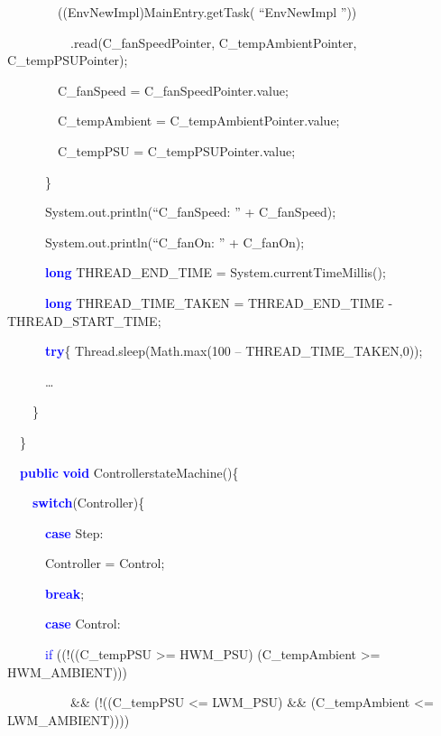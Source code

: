 \documentclass[a4paper]{article}
\begin{document}
{\ttfamily
\ \ \ \ \ \ \ \ ((EnvNewImpl)MainEntry.getTask( ``EnvNewImpl ''))}

{\ttfamily
\ \ \ \ \ \ \ \ \ \ .read(C\_fanSpeedPointer, C\_tempAmbientPointer,
C\_tempPSUPointer);}

{\ttfamily
\ \ \ \ \ \ \ \ C\_fanSpeed = C\_fanSpeedPointer.value;}

{\ttfamily
\ \ \ \ \ \ \ \ C\_tempAmbient = C\_tempAmbientPointer.value;}

{\ttfamily
\ \ \ \ \ \ \ \ C\_tempPSU = C\_tempPSUPointer.value;}

{\ttfamily
\ \ \ \ \ \ \}}

{\ttfamily
\ \ \ \ \ \ System.out.println(``C\_fanSpeed: '' + C\_fanSpeed);}

{\ttfamily
\ \ \ \ \ \ System.out.println(``C\_fanOn: '' + C\_fanOn);}

{\ttfamily
\ \ \ \ \ \ \textbf{\textcolor{blue}{long}} THREAD\_END\_TIME =
System.currentTimeMillis();}

{\ttfamily
\ \ \ \ \ \ \textbf{\textcolor{blue}{long}} THREAD\_TIME\_TAKEN =
THREAD\_END\_TIME - THREAD\_START\_TIME;}

{\ttfamily
\ \ \ \ \ \ \textbf{\textcolor{blue}{try}}\{ Thread.sleep(Math.max(100 -- THREAD\_TIME\_TAKEN,0));}

{\ttfamily
\ \ \ \ \ \ {\dots} }

{\ttfamily
\ \ \ \ \}}

{\ttfamily
\ \ \}}


\bigskip

{\ttfamily
\ \ \textbf{\textcolor{blue}{public}} \textbf{\textcolor{blue}{void}}
ControllerstateMachine()\{}

{\ttfamily
\ \ \ \ \textbf{\textcolor{blue}{switch}}(Controller)\{}

{\ttfamily
\ \ \ \ \ \ \textbf{\textcolor{blue}{case}} Step:}

{\ttfamily
\ \ \ \ \ \ Controller = Control;}

{\ttfamily
\ \ \ \ \ \ \textbf{\textcolor{blue}{break}};}

{\ttfamily
\ \ \ \ \ \ \textbf{\textcolor{blue}{case}} Control:}

{\ttfamily
\ \ \ \ \ \ \textcolor{blue}{if} ((!((C\_tempPSU {\textgreater}=
HWM\_PSU) {\textbar}{\textbar} (C\_tempAmbient {\textgreater}=
HWM\_AMBIENT))) }

{\ttfamily
\ \ \ \ \ \ \ \ \ \ \&\& (!((C\_tempPSU {\textless}= LWM\_PSU) \&\&
(C\_tempAmbient {\textless}= LWM\_AMBIENT))))}
\end{document}
